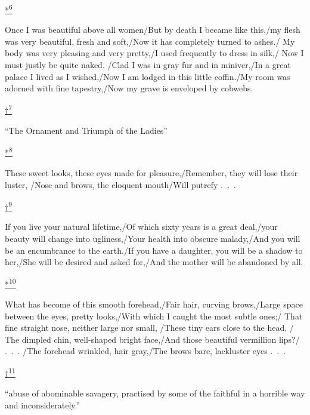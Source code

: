 \protect\hypertarget{23_NOTES.xhtmlux5cux23id_2962}{\protect\hyperlink{12_Chapter_Five__THE_VISION_OF_DEAT.xhtmlux5cux23id_2961}{*\textsuperscript{6}}}
Once I was beautiful above all women/But by death I became like this,/my
flesh was very beautiful, fresh and soft,/Now it has completely turned
to ashes./ My body was very pleasing and very pretty,/I used frequently
to dress in silk,/ Now I must justly be quite naked. /Clad I was in gray
fur and in miniver,/In a great palace I lived as I wished,/Now I am
lodged in this little coffin./My room was adorned with fine
tapestry,/Now my grave is enveloped by cobwebs.

\protect\hypertarget{23_NOTES.xhtmlux5cux23id_2964}{\protect\hyperlink{12_Chapter_Five__THE_VISION_OF_DEAT.xhtmlux5cux23id_2963}{†\textsuperscript{7}}}
``The Ornament and Triumph of the Ladies''

\protect\hypertarget{23_NOTES.xhtmlux5cux23id_2966}{\protect\hyperlink{12_Chapter_Five__THE_VISION_OF_DEAT.xhtmlux5cux23id_2965}{*\textsuperscript{8}}}
These sweet looks, these eyes made for pleasure,/Remember, they will
lose their luster, /Nose and brows, the eloquent mouth/Will putrefy
.~.~.

\protect\hypertarget{23_NOTES.xhtmlux5cux23id_2968}{\protect\hyperlink{12_Chapter_Five__THE_VISION_OF_DEAT.xhtmlux5cux23id_2967}{†\textsuperscript{9}}}
If you live your natural lifetime,/Of which sixty years is a great
deal,/your beauty will change into ugliness,/Your health into obscure
malady,/And you will be an encumbrance to the earth./If you have a
daughter, you will be a shadow to her,/She will be desired and asked
for,/And the mother will be abandoned by all.

\protect\hypertarget{23_NOTES.xhtmlux5cux23id_2970}{\protect\hyperlink{12_Chapter_Five__THE_VISION_OF_DEAT.xhtmlux5cux23id_2969}{*\textsuperscript{10}}}
What has become of this smooth forehead,/Fair hair, curving brows,/Large
space between the eyes, pretty looks,/With which I caught the most
subtle ones;/ That fine straight nose, neither large nor small, /These
tiny ears close to the head, / The dimpled chin, well-shaped bright
face,/And those beautiful vermillion lips?/ .~.~. /The forehead
wrinkled, hair gray,/The brows bare, lackluster eyes .~.~.

\protect\hypertarget{23_NOTES.xhtmlux5cux23id_2972}{\protect\hyperlink{12_Chapter_Five__THE_VISION_OF_DEAT.xhtmlux5cux23id_2971}{†\textsuperscript{11}}}
``abuse of abominable savagery, practised by some of the faithful in a
horrible way and inconsiderately.''

